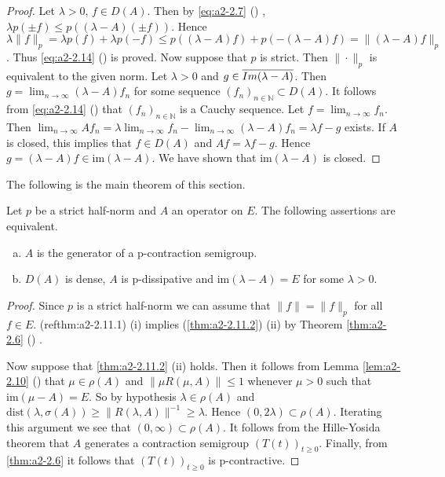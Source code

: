 \begin{proof}
Let $\lambda > 0$, $f \in D(A)$.
Then by \eqref{eq:a2-2.7} ()
, $\lambda p(\pm f) \leq p((\lambda - A)(\pm f))$.
Hence $\lambda\|f\|_{p} = \lambda p(f) + \lambda p(-f) \leq p((\lambda - A)f) + p(-(\lambda-A)f) = \|(\lambda-A)f\|_{p}$.
Thus \eqref{eq:a2-2.14} () 
is proved.
Now suppose that $p$ is strict.
Then $\|\cdot\|_{p}$ is equivalent to the given norm.
Let $\lambda > 0$ and $g \in \overline{\\Im(\lambda - A)}$.
Then $g = \lim_{n\to\infty} (\lambda - A)f_{n}$ for some sequence $(f_{n})_{n \in \mathbb{N}} \subset D(A)$.
It follows from \eqref{eq:a2-2.14} ()
that $(f_{n})_{n\in\mathbb{N}}$ is a Cauchy sequence.
Let $f = \lim_{n\to\infty} f_{n}$.
Then 
$\lim_{n\to\infty} Af_{n} 
= \lambda\lim_{n\to\infty} f_{n} - \lim_{n\to\infty} (\lambda - A)f_{n} = \lambda f - g$ 
exists.
If $A$ is closed, this implies that $f \in D(A)$ and $Af = \lambda f - g$.
Hence $g = (\lambda - A)f \in \text{im}(\lambda - A)$.
We have shown that $\text{im}(\lambda - A)$ is closed.
\end{proof}

The following is the main theorem of this section.

\begin{theorem}\label{thm:a2-2.11}
Let $p$ be a strict half-norm and $A$ an operator on $E$.
The following assertions are equivalent.
\begin{enumerate}[(a)]
\item \label{thm:a2-2.11.1}
$A$ is the generator of a p-contraction semigroup.
\item \label{thm:a2-2.11.2}
$D(A)$ is dense, $A$ is p-dissipative and $\text{im}(\lambda - A) = E$ for some $\lambda > 0$.
\end{enumerate}
\end{theorem}
\begin{proof}
Since $p$ is a strict half-norm we can assume that $\|f\| = \|f\|_{p}$ for all $f \in E$.
(ref{thm:a2-2.11.1}) (\lnm i) implies (\ref{thm:a2-2.11.2}) (\lnm ii) by Theorem \ref{thm:a2-2.6}  () .

Now suppose that \ref{thm:a2-2.11.2} (\lnm ii) holds.
Then it follows from Lemma \ref{lem:a2-2.10} () 
that $\mu \in \rho(A)$ and $\|\mu R(\mu,A)\| \leq 1$ whenever $\mu > 0$ such that $\text{im}(\mu-A) = E$.
So by hypothesis $\lambda \in \rho(A)$ and 
$\text{dist}(\lambda,\sigma(A)) \geq \|R(\lambda,A)\|^{-1} \geq \lambda$.
Hence $(0,2\lambda) \subset \rho(A)$.
Iterating this argument we see that $(0,\infty) \subset \rho(A)$.
It follows from the Hille-Yosida theorem that $A$ generates a contraction semigroup $(T(t))_{t\geq 0}$.
Finally, from \ref{thm:a2-2.6} 
it follows that $(T(t))_{t\geq 0}$ is p-contractive.
\end{proof}

